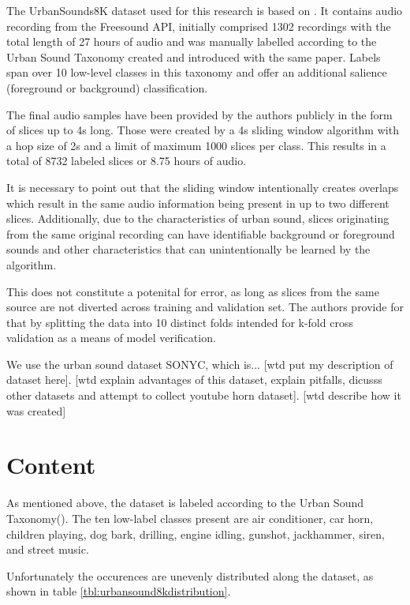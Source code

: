 The UrbanSounds8K dataset used for this research is based on \cite{Salamon:UrbanSound:ACMMM:14}. It contains audio recording from the Freesound API, initially comprised 1302 recordings with the total length of 27 hours of audio and was manually labelled according to the Urban Sound Taxonomy created and introduced with the same paper. Labels span over 10 low-level classes in this taxonomy and offer an additional salience (foreground or background) classification.

The final audio samples have been provided by the authors publicly in the form of slices up to 4s long. Those were created by a 4s sliding window algorithm with a hop size of 2s and a limit of maximum 1000 slices per class. This results in a total of 8732 labeled slices or 8.75 hours of audio.

It is necessary to point out that the sliding window intentionally creates overlaps which result in the same audio information being present in up to two different slices. Additionally, due to the characteristics of urban sound, slices originating from the same original recording can have identifiable background or foreground sounds and other characteristics that can unintentionally be learned by the algorithm. %

 This does not constitute a potenital for error, as long as 
  slices from the same source are not diverted across training and validation set. The authors provide for that by splitting the data into 10 distinct folds intended for k-fold cross validation as a means of model verification.


We use the urban sound dataset SONYC, which is... [wtd put my description of dataset here]. [wtd explain advantages of this dataset, explain pitfalls, dicusss other datasets and attempt to collect youtube horn dataset].  [wtd describe how it was created]

\section{Content}

As mentioned above, the dataset is labeled according to the Urban Sound Taxonomy(\cite{Salamon:UrbanSound:ACMMM:14}). The ten low-label classes present are air conditioner, car horn, children playing, dog bark, drilling, engine idling, gunshot, jackhammer, siren, and street music.

Unfortunately the occurences are unevenly distributed along the dataset, as shown in table \ref{tbl:urbansound8kdistribution}. 

